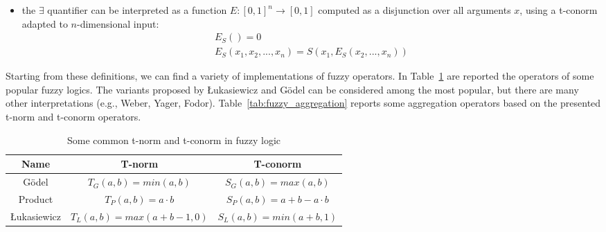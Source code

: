 \begin{itemize}
\begin{itemize}
        \item the $\exists$ quantifier can be interpreted as a function $E:[0,1]^{n} \rightarrow [0,1] $ computed as a disjunction over all arguments $x$, using a t-conorm adapted to $n$-dimensional input:
        \begin{gather*}
            E_{S}()=0 \\
            E_{S}(x_{1},x_{2},...,x_{n}) = S(x_{1},E_{S}(x_{2},...,x_{n}))
        \end{gather*}
    \end{itemize}
\end{itemize}

Starting from these definitions, we can find a variety of implementations of fuzzy operators. In Table~\ref{tab:fuzzy_norm} are reported the operators of some popular fuzzy logics. The variants proposed by Łukasiewicz and Gödel can be considered among the most popular, but there are many other interpretations (e.g., Weber, Yager, Fodor). Table~\ref{tab:fuzzy_aggregation} reports some aggregation operators based on the presented t-norm and t-conorm operators. 


\begin{table}
\centering
\caption{Some common t-norm and t-conorm in fuzzy logic}
\label{tab:fuzzy_norm}
\begin{tabular}{|c|cc|}
\hline
\textbf{Name} & \multicolumn{1}{c|}{\textbf{T-norm}} & \textbf{T-conorm}              \\ \hline
Gödel         & $T_{G}(a,b)=min(a,b)$                & $S_{G}(a,b)=max(a,b)$          \\ \hline
Product       & $T_{P}(a,b)=a \cdot b$               & $S_{P}(a,b)=a + b - a \cdot b$ \\ \hline
Łukasiewicz   & $T_{L}(a,b)=max(a+b-1,0)$            & $S_{L}(a,b)=min(a+b,1)$        \\ \hline
\end{tabular}
\end{table}

